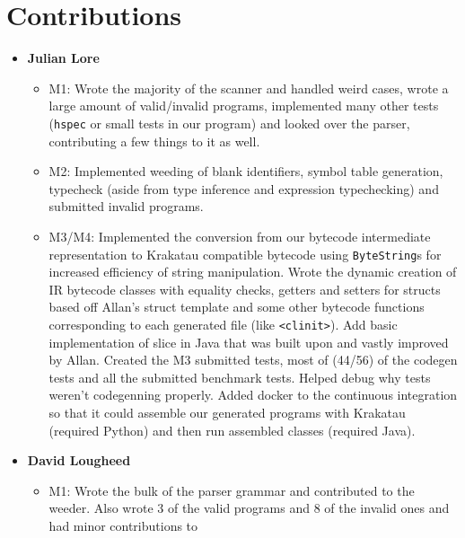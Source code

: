 \documentclass[11pt]{article}
\begin{document}
\section{Contributions}
\begin{itemize}
	\item \textbf{Julian Lore}
	\begin{itemize}
		\item M1: Wrote the majority of the scanner and
		handled weird cases, wrote a large amount of valid/invalid programs,
		implemented many other tests (\texttt{hspec} or small tests in our
		program) and looked over the parser, contributing a few things to it
		as well.
		\item M2: Implemented weeding of blank identifiers,
		symbol table generation, typecheck (aside from type inference and
		expression typechecking) and submitted invalid programs.
		\item M3/M4: Implemented the conversion from our
                  bytecode intermediate representation to
                  Krakatau\cite{krakatau} compatible bytecode using
                  \texttt{ByteString}s for increased efficiency of
                  string manipulation. Wrote the dynamic creation of
                  IR bytecode classes with equality checks, getters
                  and setters for structs based off Allan's
                  struct template and some other bytecode functions
                  corresponding to each generated file (like
                  \texttt{<clinit>}). Add basic implementation of
                  slice in Java that was built upon and vastly
                  improved by Allan. Created the M3 submitted tests,
                  most of (44/56) of the codegen tests and all the
                  submitted benchmark tests. Helped debug why tests
                  weren't codegenning properly. Added docker to the
                  continuous integration so that it could assemble our
                  generated programs with Krakatau\cite{krakatau}
                  (required Python) and then run assembled classes
                  (required Java).
	\end{itemize}
	\item \textbf{David Lougheed}
	\begin{itemize}
		\item M1: Wrote the bulk of the parser grammar
		and contributed to the weeder. Also wrote 3 of the valid programs
		and 8 of the invalid ones and had minor contributions to

\end{itemize}
\end{itemize}
\end{document}
